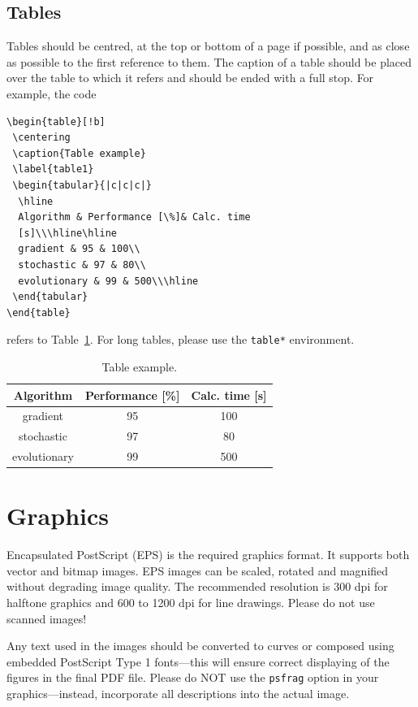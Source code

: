 \documentclass{amcs}
\begin{document}
\subsection{Tables}
%
Tables should be centred, at the top or bottom of a page if possible, and as close as possible to the first reference to them. The caption of a table should be placed over the table to which it refers and should be ended with a full stop. For example, the code
%
{\small\begin{verbatim}
\begin{table}[!b]
 \centering
 \caption{Table example}
 \label{table1}
 \begin{tabular}{|c|c|c|}
  \hline
  Algorithm & Performance [\%]& Calc. time
  [s]\\\hline\hline
  gradient & 95 & 100\\
  stochastic & 97 & 80\\
  evolutionary & 99 & 500\\\hline
 \end{tabular}
\end{table}
\end{verbatim}}
\noindent refers to Table~\ref{table1}. For long tables, please use the \verb+table*+ environment.
%
\begin{table}[!b]
 \centering
 \caption{Table example.}
 \label{table1}
 \begin{tabular}{|c|c|c|}
   \hline
   Algorithm & Performance [\%]& Calc. time [s]\\\hline\hline
   gradient & 95 & 100\\
   stochastic & 97 & 80\\
   evolutionary & 99 & 500\\\hline
 \end{tabular}
\end{table}

\section{Graphics}
Encapsulated PostScript (EPS) is the required graphics format. It
supports both vector and bitmap images. EPS images can be scaled,
rotated and magnified without degrading image quality. The recommended
resolution is 300 dpi for halftone graphics and 600 to 1200 dpi for line drawings.
Please do not use scanned images!

Any text used in the images should be converted to curves or
composed using embedded PostScript Type 1 fonts---this will ensure correct
displaying of the figures in the final PDF file. Please do NOT use the \verb+psfrag+ option
in your graphics---instead, incorporate all descriptions into the actual image.
\end{document}
